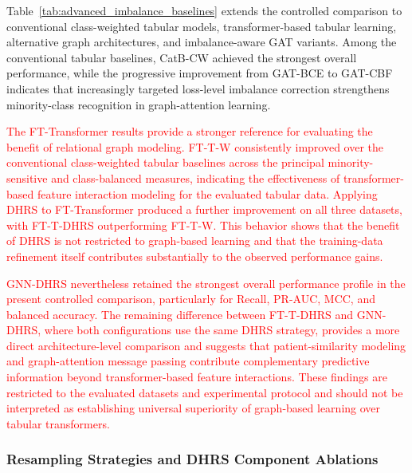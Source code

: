 \documentclass[pdflatex,sn-mathphys-num]{sn-jnl}%
\theoremstyle{thmstyleone}%
\theoremstyle{thmstyletwo}%
\theoremstyle{thmstylethree}%
\begin{document}
\begin{table}[!ht]
\end{table}

\endgroup

{
Table~\ref{tab:advanced_imbalance_baselines} extends the controlled comparison
to conventional class-weighted tabular models, transformer-based tabular
learning, alternative graph architectures, and imbalance-aware GAT variants.
Among the conventional tabular baselines, CatB-CW achieved the strongest
overall performance, while the progressive improvement from GAT-BCE to
GAT-CBF indicates that increasingly targeted loss-level imbalance correction
strengthens minority-class recognition in graph-attention learning.

\textcolor{red}{
The FT-Transformer results provide a stronger reference for evaluating the
benefit of relational graph modeling. FT-T-W consistently improved over the
conventional class-weighted tabular baselines across the principal
minority-sensitive and class-balanced measures, indicating the effectiveness
of transformer-based feature interaction modeling for the evaluated tabular
data. Applying DHRS to FT-Transformer produced a further improvement on all
three datasets, with FT-T-DHRS outperforming FT-T-W. This behavior shows that
the benefit of DHRS is not restricted to graph-based learning and that the
training-data refinement itself contributes substantially to the observed
performance gains.
}

\textcolor{red}{
GNN-DHRS nevertheless retained the strongest overall performance profile in
the present controlled comparison, particularly for Recall, PR-AUC, MCC, and
balanced accuracy. The remaining difference between FT-T-DHRS and GNN-DHRS,
where both configurations use the same DHRS strategy, provides a more direct
architecture-level comparison and suggests that patient-similarity modeling
and graph-attention message passing contribute complementary predictive
information beyond transformer-based feature interactions. These findings are
restricted to the evaluated datasets and experimental protocol and should not
be interpreted as establishing universal superiority of graph-based learning
over tabular transformers.
}

}

\subsubsection{
Resampling Strategies and DHRS Component Ablations}
\label{subsec:imbalance_strategy_comparison}
\end{document}
